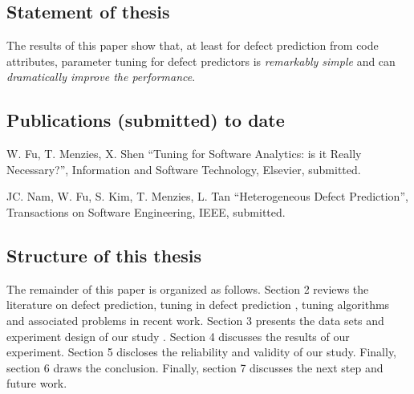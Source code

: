 \subsection{Statement of thesis}

The results of this paper show that, at least for
defect prediction from  code attributes, parameter tuning for defect predictors is {\em remarkably simple} and can {\em dramatically improve the performance}. 

\subsection{Publications (submitted) to date}

\bi
\item W. Fu, T. Menzies, X. Shen ``Tuning for Software Analytics: is it Really Necessary?'', Information and Software Technology, Elsevier, submitted.

\item JC. Nam, W. Fu, S. Kim, T. Menzies, L. Tan ``Heterogeneous Defect Prediction'', Transactions on Software Engineering, IEEE, submitted.
\ei

\subsection{Structure of this thesis}

The remainder of this paper is organized as follows. Section 2 reviews the literature on defect prediction, tuning in defect prediction , tuning algorithms and associated problems in recent work. Section 3 presents the data sets and  experiment design of our study . Section 4 discusses the results of our experiment. Section 5 discloses the reliability and validity of our study. Finally, section 6 draws the conclusion. Finally, section 7 discusses the next step and future work.



